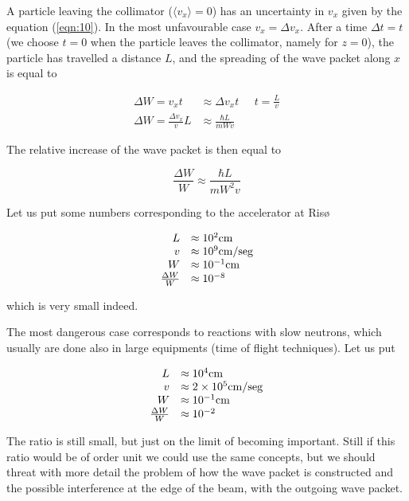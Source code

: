 A particle leaving the collimator ($\langle v_x \rangle = 0$) has an uncertainty in $v_x$ given by the equation (\ref{eqn:10}). In the most unfavourable case $v_x = \Delta v_x$. After a time $\Delta t = t$ (we choose $t=0$ when the particle leaves the collimator, namely for $z=0$), the particle has travelled a distance $L$, and the spreading of the wave packet along $x$ is equal to

\begin{equation}
\begin{array}{rl}
\Delta W = v_x t &\approx \Delta v_x t \;\;\;\;\; t = \frac{L}{v} \\
\Delta W = \frac{\Delta v_x}{v} L &\approx \frac{\hbar L}{m W v}
\end{array}
\end{equation}

\noindent The relative increase of the wave packet is then equal to

\begin{equation}
\frac{\Delta W}{W} \approx \frac{\hbar L}{m W^2 v}
\end{equation}

\noindent Let us put some numbers corresponding to the accelerator at Ris\o

\begin{equation}
\begin{array}{rl}
L &\approx 10^2 {\rm cm} \\
v &\approx 10^9 {\rm cm/seg} \\
W &\approx 10^{-1} {\rm cm} \\
\frac{\Delta W}{W} &\approx 10^{-8}
\end{array}
\end{equation}

\noindent which is very small indeed.

The most dangerous case corresponds to reactions with slow neutrons, which usually are done also in large equipments (time of flight techniques). Let us put

\begin{equation}
\begin{array}{rl}
L &\approx 10^4 {\rm cm} \\
v &\approx 2 \times 10^5 {\rm cm/seg} \\
W &\approx 10^{-1} {\rm cm} \\
\frac{\Delta W}{W} &\approx 10^{-2}
\end{array}
\end{equation}

The ratio is still small, but just on the limit of becoming important. Still if this ratio would be of order unit we could use the same concepts, but we should threat with more detail the problem of how the wave packet is constructed and the possible interference at the edge of the beam, with the outgoing wave packet.

